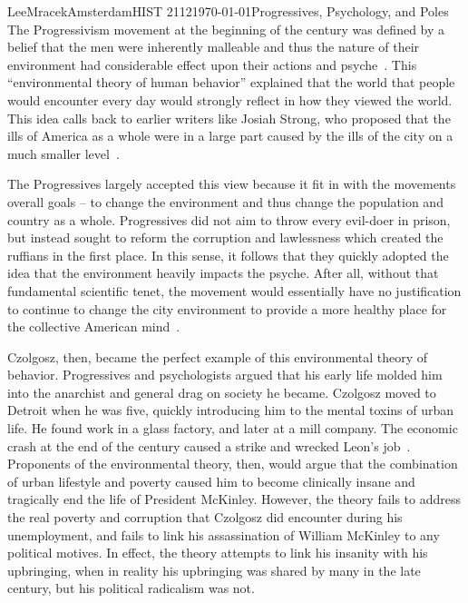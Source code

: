 \documentclass[12pt, letterpaper]{article}
\begin{document}
\begin{mla}{Lee}{Mracek}{Amsterdam}{HIST 2112}{\today}{Progressives, Psychology, and Poles}
  The Progressivism movement at the beginning of the  century was
  defined by a belief that the men were inherently malleable and thus the nature
  of their environment had considerable effect upon their actions and psyche~\parencite{psych}.
  This ``environmental theory of human behavior'' explained that the world that
  people would encounter every day would strongly reflect in how they viewed the
  world. This idea calls back to earlier writers like Josiah Strong, who
  proposed that the ills of America as a whole were in a large part caused by
  the ills of the city on a much smaller level~\parencite{strong}.

  The Progressives largely accepted this view because it fit in with the
  movements overall goals -- to change the environment and thus change the
  population and country as a whole. Progressives did not aim to throw every
  evil-doer in prison, but instead sought to reform the corruption and
  lawlessness which created the ruffians in the first place. In this sense, it
  follows that they quickly adopted the idea that the environment heavily
  impacts the psyche. After all, without that fundamental scientific tenet, the
  movement would essentially have no justification to continue to change the
  city environment to provide a more healthy place for the collective American
  mind~\parencite{psych}. 

  Czolgosz, then, became the perfect example of this environmental theory of
  behavior. Progressives and psychologists argued that his early life molded him
  into the anarchist and general drag on society he became. Czolgosz moved to
  Detroit when he was five, quickly introducing him to the mental toxins of
  urban life. He found work in a glass factory, and later at a mill company. The
  economic crash at the end of the  century caused a strike and wrecked
  Leon's job~\parencite{mckinley}. Proponents of the environmental theory, then, would argue that the
  combination of urban lifestyle and poverty caused him to become clinically
  insane and tragically end the life of President McKinley. However, the theory
  fails to address the real poverty and corruption that Czolgosz did encounter
  during his unemployment, and fails to link his assassination of William
  McKinley to any political motives. In effect, the theory attempts to link his
  insanity with his upbringing, when in reality his upbringing was shared by
  many in the late  century, but his political radicalism was not.
  \pagebreak
  \printbibliography
\end{mla}
\end{document}
